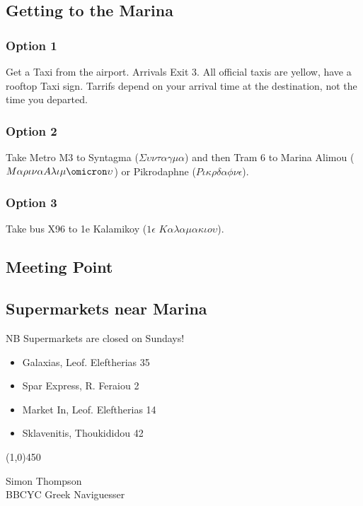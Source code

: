\documentclass[12pt,a4paper,oneside]{article}
\begin{document}
\begin{multicols}{2}
\subsection*{Getting to the Marina}
\subsubsection*{Option 1}
Get a Taxi from the airport.  Arrivals Exit 3.  All official taxis are yellow, have a rooftop Taxi sign.  Tarrifs depend on your arrival time at the destination, not the time you departed.
\subsubsection*{Option 2}
Take Metro M3 to Syntagma ($\Sigma\upsilon\nu\tau\alpha\gamma\mu\alpha$) and then Tram 6 to Marina Alimou ($M\alpha\rho\iota\nu\alpha A\lambda\iota\mu\omicron\upsilon $) or Pikrodaphne ($P\iota\kappa\rho\delta\alpha\phi\nu\epsilon $).
\subsubsection*{Option 3}
Take bus X96 to 1e Kalamikoy ($1\epsilon$ $K\alpha\lambda\alpha\mu\alpha\kappa\iota o \upsilon$).

\subsection*{Meeting Point}



\subsection*{Supermarkets near Marina}
NB Supermarkets are closed on Sundays!
\begin{itemize}
\item Galaxias, Leof. Eleftherias 35
\item Spar Express, R. Feraiou 2
\item Market In, Leof. Eleftherias 14
\item Sklavenitis, Thoukididou 42
\end{itemize}

\end{multicols}

\begin{center}
\line(1,0){450}
\end{center}

\noindent Simon Thompson\\
BBCYC Greek Naviguesser
\end{document}
